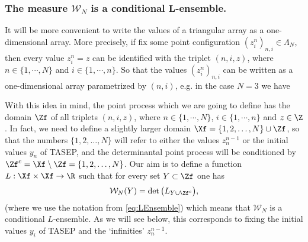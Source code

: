\documentclass[]{pcmi}
\theoremstyle{plain}
\theoremstyle{definition}
\begin{document}
\subsubsection*{The measure $\mathcal{W}_N$ is a conditional $\mathbf L$-ensemble.} It will be more convenient to write the values of a triangular array as a one-dimensional array. More precisely, if fix some point configuration $(z^n_i)_{n, i} \in \Lambda_N$, then every value $z^n_i = z$ can be identified with the triplet $(n, i, z)$, where $n \in \{1, \cdots, N\}$ and $i \in \{1, \cdots, n\}$. So that the values $(z^n_i)_{n, i}$ can be written as a one-dimensional array parametrized by $(n, i)$, e.g. in the case $N = 3$ we have
\begin{center}
\end{center}
\noindent With this idea in mind, the point process which we are going to define has the domain $\Zf$ of all triplets $(n, i, z)$, where $n \in \{1, \cdots, N\}$, $i \in \{1, \cdots, n\}$ and $z \in \Z$. In fact, we need to define a slightly larger domain $\Xf = \{1,2,\ldots,N\} \cup \Zf$, so that the numbers $\{1,2,\ldots,N\}$ will refer to either the values $z^{n-1}_{n}$ or the initial values $y_{n}$ of TASEP, and the determinantal point process will be conditioned by $\Zf^c = \Xf \setminus \Zf = \{1,2,\ldots,N\}$. Our aim is to define a function $L : \Xf \times \Xf \to \R$ such that for every set $Y \subset \Zf$ one has
\[
 \mathcal{W}_N(Y) = \det \big(L_{Y\cup\Zf^c}\big),
\]
(where we use the notation from \eqref{eq:LEnsemble}) which means that $\mathcal{W}_N$ is a conditional $L$-ensemble. As we will see below, this corresponds to fixing the initial values $y_i$ of TASEP and the `infinities' $z^{n-1}_n$.
\end{document}
